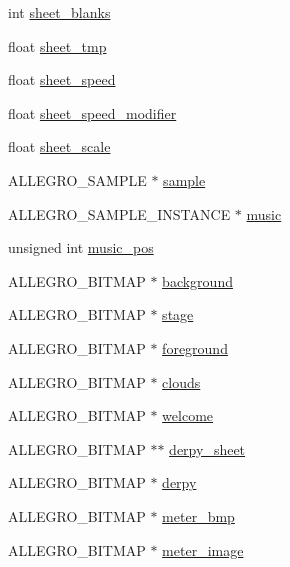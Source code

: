 \begin{DoxyCompactItemize}
\item 
int \hyperlink{structLevel_aebaaba311e5d4842fdbd8c50edd40808}{sheet\-\_\-blanks}
\item 
float \hyperlink{structLevel_a22e80ea91fd267dae85c0457e581d072}{sheet\-\_\-tmp}
\item 
float \hyperlink{structLevel_a41db1345ac158898450907010a49748f}{sheet\-\_\-speed}
\item 
float \hyperlink{structLevel_a3cae10fd441bcc14b6a47dd5fedafa59}{sheet\-\_\-speed\-\_\-modifier}
\item 
float \hyperlink{structLevel_a267a140bd3de1fc3f23a88623de425ed}{sheet\-\_\-scale}
\item 
\-A\-L\-L\-E\-G\-R\-O\-\_\-\-S\-A\-M\-P\-L\-E $\ast$ \hyperlink{structLevel_a234fa7b9ec35dd360e4e3c48a944fc7d}{sample}
\item 
\-A\-L\-L\-E\-G\-R\-O\-\_\-\-S\-A\-M\-P\-L\-E\-\_\-\-I\-N\-S\-T\-A\-N\-C\-E $\ast$ \hyperlink{structLevel_a41c6aae8f508e078b02c291e1d6f8e67}{music}
\item 
unsigned int \hyperlink{structLevel_a13e322deb3298846260af31324e5b492}{music\-\_\-pos}
\item 
\-A\-L\-L\-E\-G\-R\-O\-\_\-\-B\-I\-T\-M\-A\-P $\ast$ \hyperlink{structLevel_a4b4dd31284206502977b3d5b95d52abc}{background}
\item 
\-A\-L\-L\-E\-G\-R\-O\-\_\-\-B\-I\-T\-M\-A\-P $\ast$ \hyperlink{structLevel_ad412b858a4e688114dd89a44ecb005bb}{stage}
\item 
\-A\-L\-L\-E\-G\-R\-O\-\_\-\-B\-I\-T\-M\-A\-P $\ast$ \hyperlink{structLevel_a26c758ccdc7404a3ee0e766d1cbbf0be}{foreground}
\item 
\-A\-L\-L\-E\-G\-R\-O\-\_\-\-B\-I\-T\-M\-A\-P $\ast$ \hyperlink{structLevel_a27d34b57b66d4e7f733cb6a5cc16ff18}{clouds}
\item 
\-A\-L\-L\-E\-G\-R\-O\-\_\-\-B\-I\-T\-M\-A\-P $\ast$ \hyperlink{structLevel_a575fec7686bd94b5c35b15d73296c977}{welcome}
\item 
\-A\-L\-L\-E\-G\-R\-O\-\_\-\-B\-I\-T\-M\-A\-P $\ast$$\ast$ \hyperlink{structLevel_a0e02f3a5674a2ad3c23de22b6a4ed044}{derpy\-\_\-sheet}
\item 
\-A\-L\-L\-E\-G\-R\-O\-\_\-\-B\-I\-T\-M\-A\-P $\ast$ \hyperlink{structLevel_ae33832497116b7a0c184959bbde21ee5}{derpy}
\item 
\-A\-L\-L\-E\-G\-R\-O\-\_\-\-B\-I\-T\-M\-A\-P $\ast$ \hyperlink{structLevel_a4e78a54cbf3cdcc804f65acb03cef0b3}{meter\-\_\-bmp}
\item 
\-A\-L\-L\-E\-G\-R\-O\-\_\-\-B\-I\-T\-M\-A\-P $\ast$ \hyperlink{structLevel_a371c97dfa3d564a19648cb1b72edbf60}{meter\-\_\-image}
$$
\end{DoxyCompactItemize}
